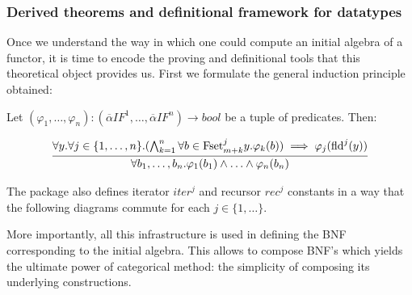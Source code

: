 \subsubsection{Derived theorems and definitional framework for datatypes}

Once we understand the way in which one could compute an initial algebra of a functor, it is time to encode the proving and definitional tools that this theoretical object provides us. First we formulate the general induction principle obtained:

\begin{thm}
	Let $(\varphi_1,\dots,\varphi_n): (\overline{\alpha} IF^1,\ldots,\overline{\alpha} IF^n) \to bool$ be a tuple of predicates. Then:
	
	\[
	\infer{\forall b_1,\ldots,b_n. \varphi_1(b_1) \land \ldots \land \varphi_n(b_n)}{%
		\forall y. \forall j \in \{1,\ldots,n\}. (\bigwedge_{k = 1}^n \forall b \in \text{Fset}_{m+k}^j y. \varphi_k(b)) \implies \varphi_j(\text{fld}^j(y))
	}
	\]
\end{thm}

The package also defines iterator $iter^j$ and recursor $rec^j$ constants in a way that the following diagrams commute for each $j \in \{1,\ldots\}$. 



More importantly, all this infrastructure is used in defining the BNF corresponding to the initial algebra. This allows to compose BNF's which yields the ultimate power of categorical method: the simplicity of composing its underlying constructions.

